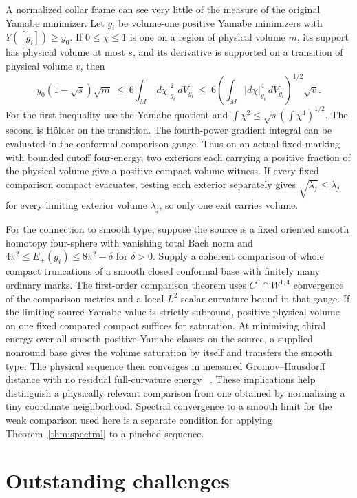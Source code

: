 \documentclass[11pt]{article}
\numberwithin{equation}{section}
\begin{document}
A normalized collar frame can see very little of the measure of
the original Yamabe minimizer. Let \(g_i\) be volume-one positive
Yamabe minimizers with \(Y([g_i])\ge y_0\). If \(0\le\chi\le1\)
is one on a region of physical volume \(m\), its support has
physical volume at most \(s\), and its derivative is supported
on a transition of physical volume \(v\), then
\begin{equation}\label{eq:dirac-volume-witness}
 y_0(1-\sqrt{s})\sqrt m\ \le\
 6\int_M|d\chi|_{g_i}^2\,dV_{g_i}\ \le\
 6\left(\int_M|d\chi|_{g_i}^4\,dV_{g_i}\right)^{1/2}\sqrt v .
\end{equation}
For the first inequality use the Yamabe quotient and
\(\int\chi^2\le\sqrt{s}(\int\chi^4)^{1/2}\).
The second is H\"older on the transition. The fourth-power
gradient integral can be evaluated in the conformal comparison
gauge. Thus on an actual fixed marking with bounded cutoff
four-energy, two exteriors each carrying a positive fraction
of the physical volume give a positive compact volume witness.
If every fixed comparison compact evacuates, testing each exterior
separately gives \(\sqrt{\lambda_j}\le\lambda_j\) for every limiting
exterior volume \(\lambda_j\), so only one exit carries volume.

For the connection to smooth type, suppose the source is a fixed
oriented smooth homotopy four-sphere with vanishing total Bach
norm and \(4\pi^2\le E_+(g_i)\le8\pi^2-\delta\) for
\(\delta>0\). Supply a coherent comparison of whole compact
truncations of a smooth closed conformal base with finitely many
ordinary marks. The first-order comparison theorem uses
\(C^0\cap W^{1,4}\) convergence of the comparison metrics and a
local \(L^2\) scalar-curvature bound in that gauge. If the limiting
source Yamabe value is strictly subround, positive physical volume
on one fixed compared compact suffices for saturation.
At minimizing chiral energy over all smooth positive-Yamabe
classes on the source, a supplied nonround base gives the volume
saturation by itself and transfers the smooth type. The physical
sequence then converges in measured Gromov--Hausdorff distance
with no residual full-curvature energy
~\cite{Baker2026TwistorSections,Baker2026MarkedLimits}.
These implications help distinguish a physically relevant comparison
from one obtained by normalizing a tiny coordinate neighborhood.
Spectral convergence to a smooth limit for the weak comparison
used here is a separate condition for applying
Theorem~\ref{thm:spectral} to a pinched sequence.

\section{Outstanding challenges}\label{sec:open}
\end{document}
